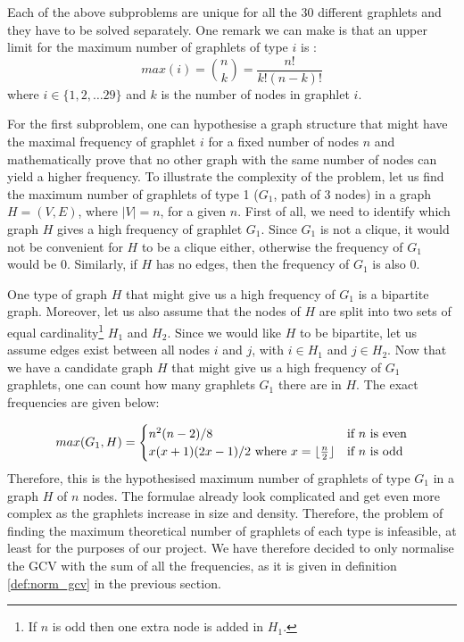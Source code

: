 Each of the above subproblems are unique for all the 30 different graphlets and they have to be solved separately. One remark we can make is that an upper limit for the maximum number of graphlets of type $i$ is :
$$ max(i) = {n \choose k} = \frac{n!}{k! (n-k)!} $$ 
where $i \in \{1,2, \dots 29\}$ and $k$ is the number of nodes in graphlet $i$.

For the first subproblem, one can hypothesise a graph structure that might have the maximal frequency of graphlet $i$ for a fixed number of nodes $n$ and mathematically prove that no other graph with the same number of nodes can yield a higher frequency. To illustrate the complexity of the problem, let us find the maximum number of graphlets of type 1 ($G_1$, path of 3 nodes) in a graph $H=(V,E)$, where $|V| = n$, for a given $n$. First of all, we need to identify which graph $H$ gives a high frequency of graphlet $G_1$. Since $G_1$ is not a clique, it would not be convenient for $H$ to be a clique either, otherwise the frequency of $G_1$ would be 0. Similarly, if $H$ has no edges, then the frequency of $G_1$ is also 0. 

One type of graph $H$ that might give us a high frequency of $G_1$ is a bipartite graph. Moreover, let us also assume that the nodes of $H$ are split into two sets of equal cardinality\footnote{If $n$ is odd then one extra node is added in $H_1$.} $H_1$ and $H_2$. Since we would like $H$ to be bipartite, let us assume edges exist between all nodes $i$ and $j$, with $i \in H_1$ and $j \in H_2$. Now that we have a candidate graph $H$ that might give us a high frequency of $G_1$ graphlets, one can count how many graphlets $G_1$ there are in $H$. The exact frequencies are given below:

$$max(G_1, H) = \begin{cases}
   n^2(n-2)/8  & \text{if } n \text{ is even} \\
   x(x+1)(2x-1)/2 \text{ where } x = \lfloor\frac{n}{2}\rfloor & \text{if } n \text{ is odd}
  \end{cases}$$
Therefore, this is the hypothesised maximum number of graphlets of type $G_1$ in a graph $H$ of $n$ nodes. The formulae already look complicated and get even more complex as the graphlets increase in size and density. Therefore, the problem of finding the maximum theoretical number of graphlets of each type is infeasible, at least for the purposes of our project. We have therefore decided to only normalise the GCV with the sum of all the frequencies, as it is given in definition \ref{def:norm_gcv} in the previous section.


